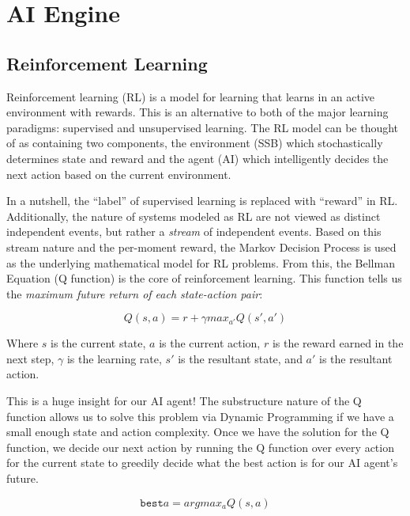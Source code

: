 \chapter*{AI Engine}

\section*{Reinforcement Learning}
Reinforcement learning (RL) is a model for learning that learns in an active environment with rewards.
This is an alternative to both of the major learning paradigms: supervised and unsupervised learning.
The RL model can be thought of as containing two components, the environment (SSB) which stochastically determines state and reward and the agent (AI) which intelligently decides the next action based on the current environment.


In a nutshell, the ``label'' of supervised learning is replaced with ``reward'' in RL.
Additionally, the nature of systems modeled as RL are not viewed as distinct independent events, but rather a \textit{stream} of independent events.
Based on this stream nature and the per-moment reward, the Markov Decision Process is used as the underlying mathematical model for RL problems.
From this, the Bellman Equation (Q function) is the core of reinforcement learning. 
This function tells us the \textit{maximum future return of each state-action pair}:

\begin{equation}
Q(s,a) = r + \gamma max_{a'}Q(s', a')
\end{equation}

Where $s$ is the current state, $a$ is the current action, $r$ is the reward earned in the next step, $\gamma$ is the learning rate, $s'$ is the resultant state, and $a'$ is the resultant action.

This is a huge insight for our AI agent!
The substructure nature of the Q function allows us to solve this problem via Dynamic Programming if we have a small enough state and action complexity.
Once we have the solution for the Q function, we decide our next action by running the Q function over every action for the current state to greedily decide what the best action is for our AI agent's future.

\begin{equation}
\texttt{best} a = argmax_a Q(s, a)
\end{equation}

